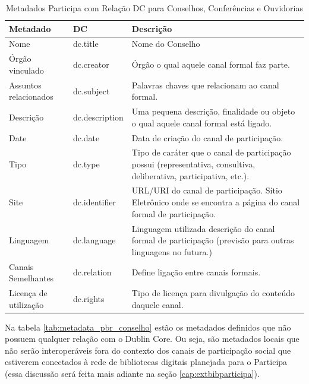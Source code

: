 \begin{table}[H]
	\begin{center}
    \begin{tabular}{| l | l | p{7cm} |}
    \hline
    \textbf{Metadado} & \textbf{DC} & \textbf{Descrição}  \\ \hline
    Nome & dc.title & Nome do Conselho \\ \hline
    Órgão vinculado & dc.creator & Órgão o qual aquele canal formal faz parte. \\ \hline
    Assuntos relacionados & dc.subject & Palavras chaves que relacionam ao canal formal. \\ \hline
    Descrição & dc.description & Uma pequena descrição, finalidade ou objeto o qual aquele canal formal está ligado.\\ \hline
    Date & dc.date & Data de criação do canal de participação. \\ \hline
    Tipo & dc.type & Tipo de caráter que o canal de participação possui (representativa, consultiva, deliberativa, participativa, etc.). \\ \hline
    Site & dc.identifier & URL/URI do canal de participação. Sítio Eletrônico onde se encontra a página do canal formal de participação. \\ \hline
    Linguagem & dc.language & Linguagem utilizada descrição do canal formal de participação (previsão para outras linguagens no futura.) \\ \hline
    Canais Semelhantes & dc.relation & Define ligação entre canais formais. \\ \hline
    Licença de utilização & dc.rights & Tipo de licença para divulgação do conteúdo daquele canal. \\ \hline
    \end{tabular}
    \end{center}
    \caption{Metadados Participa com Relação DC para Conselhos, Conferências e Ouvidorias}
    \label{tab:metadata_dc_conselho}
\end{table}

Na tabela \ref{tab:metadata_pbr_conselho} estão os metadados definidos que não possuem qualquer relação com o Dublin Core. Ou seja, são metadados locais que não serão interoperáveis fora do contexto dos canais de participação social que estiverem conectados à rede de bibliotecas digitais planejada para o Participa (essa discussão será feita mais adiante na seção \ref{cap:extbibparticipa}).

